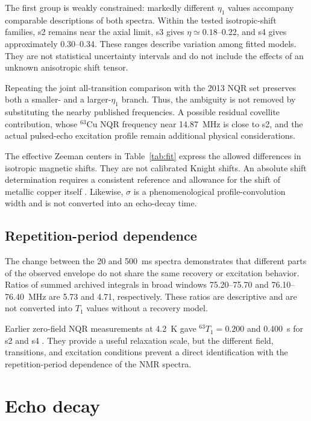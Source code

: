 \documentclass[10pt,a4paper,twocolumn]{article}
\begin{document}
The first group is weakly constrained: markedly different $\eta_1$ values accompany comparable descriptions of both spectra. Within the tested isotropic-shift families, s2 remains near the axial limit, s3 gives $\eta\simeq0.18$--0.22, and s4 gives approximately 0.30--0.34. These ranges describe variation among fitted models. They are not statistical uncertainty intervals and do not include the effects of an unknown anisotropic shift tensor.

Repeating the joint all-transition comparison with the 2013 NQR set preserves both a smaller- and a larger-$\eta_1$ branch. Thus, the ambiguity is not removed by substituting the nearby published frequencies. A possible residual covellite contribution, whose $^{63}$Cu NQR frequency near 14.87~MHz is close to s2, and the actual pulsed-echo excitation profile remain additional physical considerations.

The effective Zeeman centers in Table~\ref{tab:fit} express the allowed differences in isotropic magnetic shifts. They are not calibrated Knight shifts. An absolute shift determination requires a consistent reference and allowance for the shift of metallic copper itself \citep{Locher1974,Harris2001}. Likewise, $\sigma$ is a phenomenological profile-convolution width and is not converted into an echo-decay time.

\subsection{Repetition-period dependence}

The change between the 20 and 500~ms spectra demonstrates that different parts of the observed envelope do not share the same recovery or excitation behavior. Ratios of summed archived integrals in broad windows 75.20--75.70 and 76.10--76.40~MHz are 5.73 and 4.71, respectively. These ratios are descriptive and are not converted into $T_1$ values without a recovery model.

Earlier zero-field NQR measurements at 4.2~K gave $^{63}T_1=0.200$ and 0.400~s for s2 and s4 \citep[p.~27]{Evlampiev2009}. They provide a useful relaxation scale, but the different field, transitions, and excitation conditions prevent a direct identification with the repetition-period dependence of the NMR spectra.

\section{Echo decay}
\end{document}
